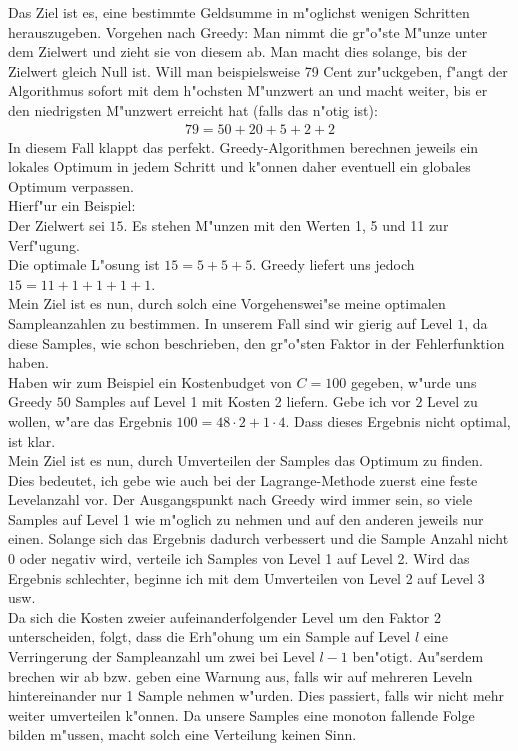 Das Ziel ist es, eine bestimmte Geldsumme in m"oglichst wenigen Schritten herauszugeben.
Vorgehen nach Greedy: Man nimmt die gr"o"ste M"unze unter dem Zielwert und zieht sie von diesem ab. Man macht dies solange, bis der Zielwert gleich Null ist. Will man beispielsweise 79 Cent zur"uckgeben, f"angt der Algorithmus sofort mit dem h"ochsten M"unzwert an und macht weiter, bis er den niedrigsten M"unzwert erreicht hat (falls das n"otig ist): 
\begin{align*}
79=50 + 20 + 5 + 2 +2
\end{align*}
In diesem Fall klappt das perfekt. Greedy-Algorithmen berechnen jeweils ein  \glqq lokales Optimum\grqq{ } in jedem Schritt und k"onnen daher eventuell ein \glqq globales Optimum\grqq{ } verpassen.\\ Hierf"ur ein Beispiel:\\
Der Zielwert sei $15$. Es stehen M"unzen mit den Werten 1, 5 und 11 zur Verf"ugung.\\
Die optimale L"osung ist $15=5+5+5$. Greedy liefert uns jedoch $15=11+1+1+1+1$.\\[0,5cm]
Mein Ziel ist es nun, durch solch eine Vorgehenswei"se meine optimalen Sampleanzahlen zu bestimmen. In unserem Fall sind wir \glqq gierig\grqq{ } auf Level $1$, da diese Samples, wie schon beschrieben, den gr"o"sten Faktor in der Fehlerfunktion haben.\\
Haben wir zum Beispiel ein Kostenbudget von $C=100$ gegeben, w"urde uns Greedy $50$ Samples auf Level 1 mit Kosten 2 liefern.
Gebe ich vor $2$ Level zu wollen, w"are das Ergebnis $100=48 \cdot 2+ 1\cdot 4$. Dass dieses Ergebnis nicht optimal, ist klar.\\
Mein Ziel ist es nun, durch Umverteilen der Samples das Optimum zu finden.
Dies bedeutet, ich gebe wie auch bei der Lagrange-Methode zuerst eine feste Levelanzahl vor. Der Ausgangspunkt nach Greedy wird immer sein, so viele Samples auf Level 1 wie m"oglich zu nehmen und auf den anderen jeweils nur einen. Solange sich das Ergebnis dadurch verbessert und die Sample Anzahl nicht 0 oder negativ wird, verteile ich Samples von Level 1 auf Level 2. Wird das Ergebnis schlechter, beginne ich mit dem Umverteilen von Level 2 auf Level 3 usw. \\
Da sich die Kosten zweier aufeinanderfolgender Level um den Faktor 2 unterscheiden, folgt, dass die Erh"ohung um ein Sample auf Level $l$ eine Verringerung der Sampleanzahl um zwei bei Level $l-1$ ben"otigt.
Au"serdem brechen wir ab bzw. geben eine Warnung aus, falls wir auf mehreren Leveln hintereinander nur 1 Sample nehmen w"urden. Dies passiert, falls wir nicht mehr weiter umverteilen k"onnen. Da unsere Samples eine monoton fallende Folge bilden m"ussen, macht solch eine Verteilung keinen Sinn. \newpage
